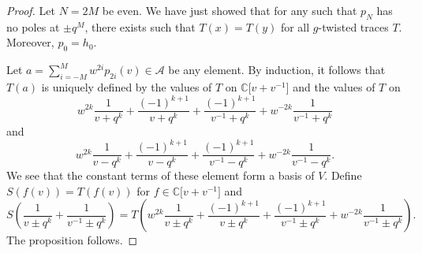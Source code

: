 \documentclass[pdftex]{sigma}
\newcommand\CC{\mathbb{C}}
\newcommand{\mc}{\mathcal}
\numberwithin{equation}{section}
\theoremstyle{definition}
\begin{document}
\begin{proof}
 Let $N=2M$ be even. We have just showed that for any \smash{$x=\sum_{i=-M}^M w^{2i} p_{2i}(v)\in\mc{A}$} such that $p_N$ has no poles at $\pm q^{M}$, there exists  such that $T(x)=T(y)$ for all $g$-twisted traces $T$. Moreover, $p_0=h_0$.

 Let $a=\sum_{i=-M}^M w^{2i} p_{2i}(v)\in\mc{A}$ be any element. By induction, it follows that $T(a)$ is uniquely defined by the values of $T$ on $\CC\big[v+v^{-1}\big]$ and the values of $T$ on \[w^{2k}\frac{1}{v+q^k}+\frac{(-1)^{k+1}}{v+q^k}+\frac{(-1)^{k+1}}{v^{-1}+q^k}+w^{-2k}\frac{1}{v^{-1}+q^k}\]and
 \[w^{2k}\frac{1}{v-q^k}+\frac{(-1)^{k+1}}{v-q^k}+\frac{(-1)^{k+1}}{v^{-1}-q^k}+w^{-2k}\frac{1}{v^{-1}-q^k}.\] We see that the constant terms of these element form a basis of $V$. Define $S(f(v))=T(f(v))$ for $f\in \CC\big[v+v^{-1}\big]$ and
 \[S\left(\frac{1}{v\pm q^k}+\frac{1}{v^{-1}\pm q^k}\right)=T\left(w^{2k}\frac{1}{v\pm q^k}+\frac{(-1)^{k+1}}{v\pm q^k}+\frac{(-1)^{k+1}}{v^{-1}\pm q^k}+w^{-2k}\frac{1}{v^{-1}\pm q^k}\right).\] The proposition follows.
\end{proof}
\end{document}
